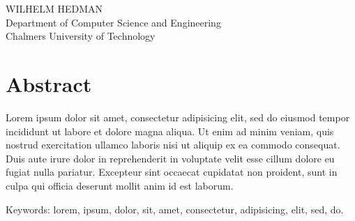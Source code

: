 \fullt\\
\subt\\
WILHELM HEDMAN\\
Department of Computer Science and Engineering\\
Chalmers University of Technology \setlength{\parskip}{0.5cm}

\thispagestyle{plain}			%
\setlength{\parskip}{0pt plus 1.0pt}
\section*{Abstract}
Lorem ipsum dolor sit amet, consectetur adipisicing elit, sed do eiusmod tempor incididunt ut labore et dolore magna aliqua. Ut enim ad minim veniam, quis nostrud exercitation ullamco laboris nisi ut aliquip ex ea commodo consequat. Duis aute irure dolor in reprehenderit in voluptate velit esse cillum dolore eu fugiat nulla pariatur. Excepteur sint occaecat cupidatat non proident, sunt in culpa qui officia deserunt mollit anim id est laborum.

\vfill
Keywords: lorem, ipsum, dolor, sit, amet, consectetur, adipisicing, elit, sed, do.

\newpage				%
\thispagestyle{empty}
\mbox{}